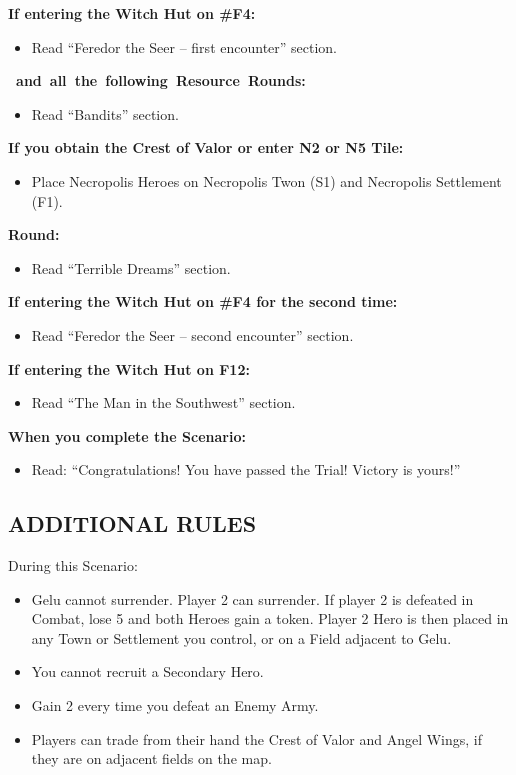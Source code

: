 \begin{multicols*}{2}
\textbf{If entering the Witch Hut on \#F4:}
\begin{itemize}
  \item Read ``Feredor the Seer -- first encounter'' section.
\end{itemize}

\textbf{\mbox{ and all the following Resource Rounds:}}
\begin{itemize}
  \item Read ``Bandits'' section.
\end{itemize}

\textbf{If you obtain the Crest of Valor or enter N2 or N5 Tile:}
\begin{itemize}
  \item Place Necropolis Heroes on Necropolis Twon (S1) and Necropolis Settlement (F1).
\end{itemize}

\textbf{ Round:}
\begin{itemize}
  \item Read ``Terrible Dreams'' section.
\end{itemize}

\textbf{If entering the Witch Hut on \#F4 for the second time:}
\begin{itemize}
\item Read ``Feredor the Seer -- second encounter'' section.
\end{itemize}

\textbf{If entering the Witch Hut on F12:}
\begin{itemize}
\item Read ``The Man in the Southwest'' section.
\end{itemize}

\textbf{When you complete the Scenario:}
\begin{itemize}
  \item Read: ``Congratulations! You have passed the Trial! Victory is yours!''
\end{itemize}


\subsection*{\MakeUppercase{Additional Rules}}

During this Scenario:

\begin{itemize}
    \item Gelu cannot surrender.
      Player 2 can surrender.
      If player 2 is defeated in Combat, lose 5  and both Heroes gain a  token.
      Player 2 Hero is then placed in any Town or Settlement you control, or on a Field adjacent to Gelu.
    \item You cannot recruit a Secondary Hero.
    \item Gain 2  every time you defeat an Enemy Army.
    \item Players can trade from their hand the Crest of Valor and Angel Wings, if they are on adjacent fields on the map.
\end{itemize}


\end{multicols*}
